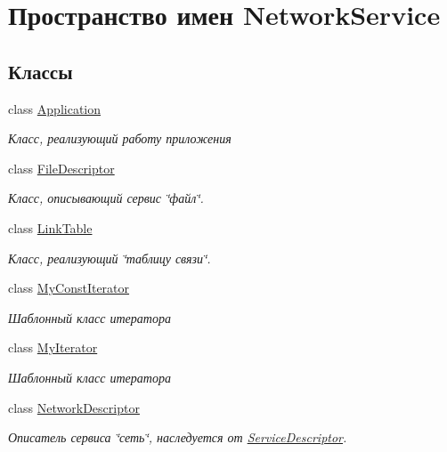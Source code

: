 \hypertarget{namespace_network_service}{}\section{Пространство имен Network\+Service}
\label{namespace_network_service}
\subsection*{Классы}
\begin{DoxyCompactItemize}
\item 
class \hyperlink{class_network_service_1_1_application}{Application}
\begin{DoxyCompactList}\small\item\em Класс, реализующий работу приложения \end{DoxyCompactList}\item 
class \hyperlink{class_network_service_1_1_file_descriptor}{File\+Descriptor}
\begin{DoxyCompactList}\small\item\em Класс, описывающий сервис \char`\"{}файл\char`\"{}. \end{DoxyCompactList}\item 
class \hyperlink{class_network_service_1_1_link_table}{Link\+Table}
\begin{DoxyCompactList}\small\item\em Класс, реализующий \char`\"{}таблицу связи\char`\"{}. \end{DoxyCompactList}\item 
class \hyperlink{class_network_service_1_1_my_const_iterator}{My\+Const\+Iterator}
\begin{DoxyCompactList}\small\item\em Шаблонный класс итератора \end{DoxyCompactList}\item 
class \hyperlink{class_network_service_1_1_my_iterator}{My\+Iterator}
\begin{DoxyCompactList}\small\item\em Шаблонный класс итератора \end{DoxyCompactList}\item 
class \hyperlink{class_network_service_1_1_network_descriptor}{Network\+Descriptor}
\begin{DoxyCompactList}\small\item\em Описатель сервиса \char`\"{}сеть\char`\"{}, наследуется от \hyperlink{class_network_service_1_1_service_descriptor}{Service\+Descriptor}. \end{DoxyCompactList}\item 

\end{DoxyCompactItemize}
